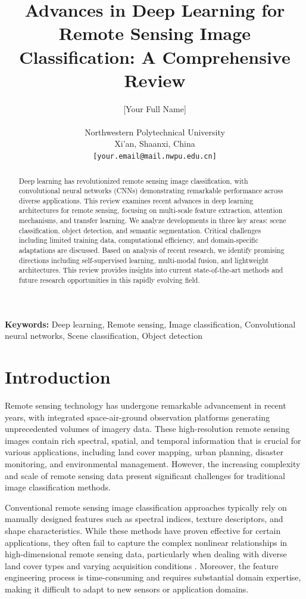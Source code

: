 \documentclass[12pt,a4paper]{article}
\title{\fontsize{14}{17}\selectfont\textbf{Advances in Deep Learning for Remote Sensing Image Classification: A Comprehensive Review}}
\author{[Your Full Name]\\
[Your School/College]\\
Northwestern Polytechnical University\\
Xi'an, Shaanxi, China\\
\texttt{[your.email@mail.nwpu.edu.cn]}}
\date{}
\begin{document}
\maketitle

\begin{abstract}
Deep learning has revolutionized remote sensing image classification, with convolutional neural networks (CNNs) demonstrating remarkable performance across diverse applications. This review examines recent advances in deep learning architectures for remote sensing, focusing on multi-scale feature extraction, attention mechanisms, and transfer learning. We analyze developments in three key areas: scene classification, object detection, and semantic segmentation. Critical challenges including limited training data, computational efficiency, and domain-specific adaptations are discussed. Based on analysis of recent research, we identify promising directions including self-supervised learning, multi-modal fusion, and lightweight architectures. This review provides insights into current state-of-the-art methods and future research opportunities in this rapidly evolving field.
\end{abstract}

\textbf{Keywords:} Deep learning, Remote sensing, Image classification, Convolutional neural networks, Scene classification, Object detection

\section{Introduction}
\label{sec:introduction}

Remote sensing technology has undergone remarkable advancement in recent years, with integrated space-air-ground observation platforms generating unprecedented volumes of imagery data. These high-resolution remote sensing images contain rich spectral, spatial, and temporal information that is crucial for various applications, including land cover mapping, urban planning, disaster monitoring, and environmental management. However, the increasing complexity and scale of remote sensing data present significant challenges for traditional image classification methods.

Conventional remote sensing image classification approaches typically rely on manually designed features such as spectral indices, texture descriptors, and shape characteristics. While these methods have proven effective for certain applications, they often fail to capture the complex nonlinear relationships in high-dimensional remote sensing data, particularly when dealing with diverse land cover types and varying acquisition conditions \cite{cheng2016survey}. Moreover, the feature engineering process is time-consuming and requires substantial domain expertise, making it difficult to adapt to new sensors or application domains.
\end{document}
